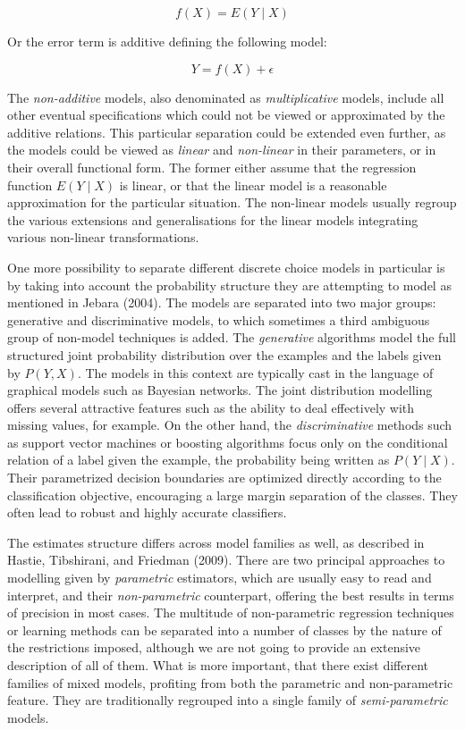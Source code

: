 \documentclass[11pt,]{article}
\begin{document}
\begin{equation}
f(X) = E(Y \mid X)
\end{equation}

Or the error term is additive defining the following model:

\begin{equation}
Y = f(X) + \epsilon
\end{equation}

The \emph{non-additive} models, also denominated as
\emph{multiplicative} models, include all other eventual specifications
which could not be viewed or approximated by the additive relations.
This particular separation could be extended even further, as the models
could be viewed as \emph{linear} and \emph{non-linear} in their
parameters, or in their overall functional form. The former either
assume that the regression function \(E(Y \mid X)\) is linear, or that
the linear model is a reasonable approximation for the particular
situation. The non-linear models usually regroup the various extensions
and generalisations for the linear models integrating various non-linear
transformations.

One more possibility to separate different discrete choice models in
particular is by taking into account the probability structure they are
attempting to model as mentioned in Jebara (2004). The models are
separated into two major groups: generative and discriminative models,
to which sometimes a third ambiguous group of non-model techniques is
added. The \emph{generative} algorithms model the full structured joint
probability distribution over the examples and the labels given by
\(P(Y, X)\). The models in this context are typically cast in the
language of graphical models such as Bayesian networks. The joint
distribution modelling offers several attractive features such as the
ability to deal effectively with missing values, for example. On the
other hand, the \emph{discriminative} methods such as support vector
machines or boosting algorithms focus only on the conditional relation
of a label given the example, the probability being written as
\(P(Y \mid X)\). Their parametrized decision boundaries are optimized
directly according to the classification objective, encouraging a large
margin separation of the classes. They often lead to robust and highly
accurate classifiers.

The estimates structure differs across model families as well, as
described in Hastie, Tibshirani, and Friedman (2009). There are two
principal approaches to modelling given by \emph{parametric} estimators,
which are usually easy to read and interpret, and their
\emph{non-parametric} counterpart, offering the best results in terms of
precision in most cases. The multitude of non-parametric regression
techniques or learning methods can be separated into a number of classes
by the nature of the restrictions imposed, although we are not going to
provide an extensive description of all of them. What is more important,
that there exist different families of mixed models, profiting from both
the parametric and non-parametric feature. They are traditionally
regrouped into a single family of \emph{semi-parametric} models.
\end{document}

